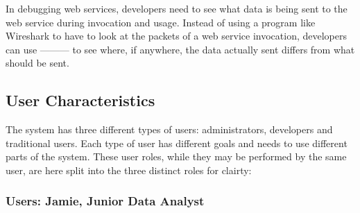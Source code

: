 \documentclass[titlepage]{article}
\begin{document}
In debugging web services, developers need to see what data is being sent to
the web service during invocation and usage.  Instead of using a program like
Wireshark to have to look at the packets of a web service invocation,
developers can use --------- to see where, if anywhere, the data actually
sent differs from what should be sent.


\subsection{User Characteristics%
  \label{user-characteristics}%
}

The system has three different types of users:  administrators, developers and
traditional users.  Each type of user has different goals and needs to use
different parts of the system.  These user roles, while they may be performed
by the same user, are here split into the three distinct roles for clairty:


\subsubsection{Users: Jamie, Junior Data Analyst%
  \label{jamie}%
}
\end{document}
